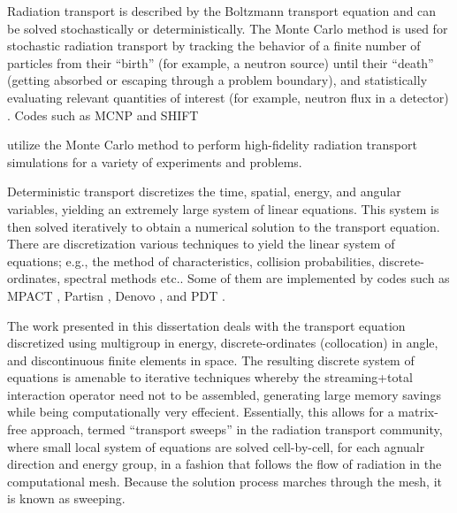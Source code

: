 Radiation transport is described by the Boltzmann transport equation \cite{bell_glasstone,zweifel,davison,duderstadt} and can be solved stochastically or deterministically.
The Monte Carlo method is used for stochastic radiation transport by tracking the behavior of a finite number of particles from their ``birth'' (for example, a neutron source) until their ``death'' (getting absorbed or escaping through a problem boundary), and statistically evaluating relevant quantities of interest (for example, neutron flux in a detector) \cite{shultis_mc}.
Codes such as MCNP \cite{MCNP} and SHIFT {\cite{shift} utilize the Monte Carlo method to perform high-fidelity radiation transport simulations for a variety of experiments and problems.

Deterministic transport discretizes the time, spatial, energy, and angular variables, yielding an extremely large system of linear equations. This system is then solved iteratively to obtain a numerical solution to the transport equation.
There are discretization various techniques to yield the linear system of equations; e.g., the method of characteristics, collision probabilities, discrete-ordinates, spectral methods etc.. Some of them are  implemented by codes such as MPACT \cite{mpact}, Partisn \cite{partisn}, Denovo \cite{denovo}, and PDT \cite{mpadams2013,mpadams2015}.

The work presented in this dissertation deals with the transport equation discretized using multigroup in energy, discrete-ordinates (collocation) in angle, and discontinuous finite elements in space. The resulting discrete system of equations is amenable to iterative techniques whereby the streaming+total interaction operator need not to be assembled, generating large memory savings while being computationally very effecient.  Essentially, this allows for a matrix-free approach, termed ``transport sweeps'' in the radiation transport community, where small local system of equations are solved cell-by-cell, for each agnualr direction and energy group, in a fashion that follows the flow of radiation in the computational mesh.
Because the solution process marches through the mesh, it is known as sweeping.

}
